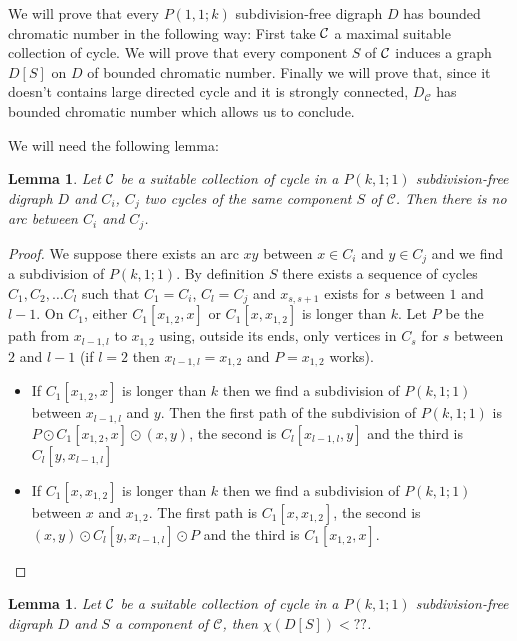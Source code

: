 \documentclass[utf8,10pt]{article}
\theoremstyle{plain}
\newtheorem{lemma}[theorem]{Lemma}
\theoremstyle{definition}
\theoremstyle{remark}
\begin{document}
We will prove that every $P(1,1;k)$ subdivision-free digraph $D$ has bounded chromatic number in the following way:
First take ${\cal C}$ a maximal suitable collection of cycle. 
We will prove that every component $S$ of ${\cal C}$ induces a graph $D[S]$ on $D$ of bounded chromatic number. 
Finally we will prove that, since it doesn't contains large directed cycle and it is strongly connected, $D_{\mathcal{C}}$ has bounded chromatic number
which allows us to conclude.  

We will need the following lemma:

\begin{lemma}
Let ${\cal C}$ be a suitable collection of cycle in a $P(k,1;1)$ subdivision-free digraph $D$ and $C_i$, $C_j$ two cycles of the same
component $S$ of $\mathcal{C}$. Then there is no arc between $C_i$ and $C_j$. 
\end{lemma}

\begin{proof}
We suppose there exists an arc $xy$ between $x \in C_i$ and $y \in C_j$ and we find a subdivision of $P(k,1;1)$. 
By definition $S$ there exists a sequence of cycles $C_1, C_2, \dots C_l$ such that $C_1 = C_i$, $C_l = C_j$ and $x_{s,s+1}$ exists for $s$ between $1$ and $l-1$.
On $C_1$, either $C_1[x_{1,2}, x]$ or $C_1[x, x_{1,2}]$ is longer than $k$. 
Let $P$ be the path from $x_{l-1,l}$ to $x_{1,2}$ using, outside its ends, only vertices in $C_s$ for $s$ between $2$ and $l-1$ (if $l = 2$ then
$x_{l-1,l} = x_{1,2}$ and $P = x_{1,2}$ works).
\begin{itemize}
	\item If $C_1[x_{1,2}, x]$ is longer than $k$ then we find a subdivision of $P(k,1;1)$ between $x_{l-1,l}$ and $y$. 
	Then the first path of the subdivision of $P(k,1;1)$ is $P \odot C_1[x_{1,2}, x] \odot (x,y)$, the second is 
	$C_l[x_{l-1,l}, y]$ and the third is $C_l[ y, x_{l-1,l}]$
	\item If $C_1[x, x_{1,2}]$ is longer than $k$ then we find a subdivision of $P(k,1;1)$ between $x$ and $x_{1,2}$.
	The first path is $C_1[x, x_{1,2}]$, the second is $(x,y) \odot C_l[y, x_{l-1,l}] \odot P$ and the third is $C_1[x_{1,2}, x]$. 
\end{itemize}
\end{proof}

\begin{lemma}
Let ${\cal C}$ be a suitable collection of cycle in a $P(k,1;1)$ subdivision-free digraph $D$ and $S$ a component of $\mathcal{C}$, then $\chi(D[S]) < ??$.	 
\end{lemma}
\end{document}
